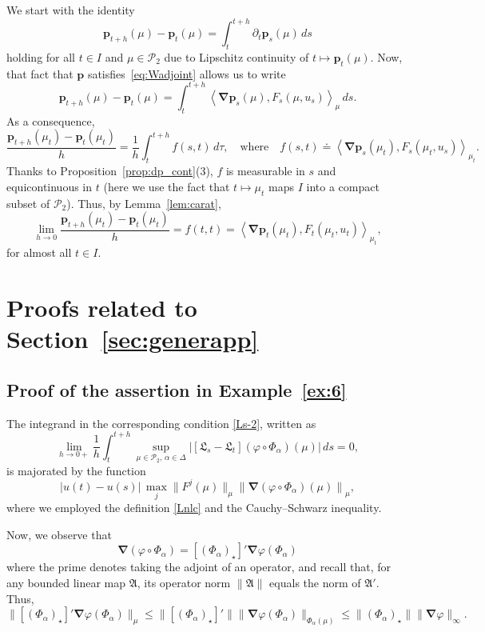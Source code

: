 \documentclass[sn-mathphys-num]{sn-jnl}
\numberwithin{equation}{section}
\theoremstyle{mythm}
\theoremstyle{mydef}
\newenvironment{proofof}[1]{\smallskip\noindent{\textbf{Proof~of~#1.}}%
  \hspace{1pt}}{\hspace{-5pt}{\nobreak\quad\nobreak\hfill\nobreak%
    $\square$\vspace{2pt}\par}\smallskip\goodbreak}
\renewcommand{\phi}{\varphi}
\renewcommand{\d}{\,d}
\renewcommand{\mathbf}[1]{\bm{#1}}
\begin{document}
\begin{proofof}{Proposition~\ref{prop:sysdif}}
  We start with the identity
  \[
    \mathbf{p}_{t+h}(\mu) - \mathbf{p}_t(\mu) = \int_t^{t+h} \partial_t \mathbf{p}_{s}(\mu)\d s
  \]
  holding for all \( t\in I \) and \( \mu\in \mathcal{P}_2 \) due to Lipschitz continuity of \( t\mapsto \mathbf{p}_t(\mu) \).
  Now, that fact that \( \mathbf{p} \) satisfies~\eqref{eq:Wadjoint} allows us to write
  \[
    \mathbf{p}_{t+h}(\mu) - \mathbf{p}_t(\mu) = \int_t^{t+h} \left< \bm \nabla \mathbf{p}_{s}(\mu), F_s(\mu,u_s) \right>_{\mu}\d s.
  \]
  As a consequence,
  \[
    \frac{\mathbf{p}_{t+h}(\mu_t) - \mathbf{p}_t(\mu_t)}{h} = \frac{1}{h}\int_t^{t+h} f(s,t) \d \tau,\quad \text{where} \quad f(s,t) \doteq \left< \bm \nabla \mathbf{p}_{s}(\mu_t), F_s(\mu_t,u_s) \right>_{\mu_t}.
  \]
  Thanks to Proposition~\ref{prop:dp_cont}(3), \( f \) is measurable in \( s \) and equicontinuous in \( t \) (here we use the fact that \( t\mapsto \mu_t \) maps \( I \) into a compact subset of \( \mathcal{P}_2 \)).
  Thus, by Lemma~\ref{lem:carat},
\[
  \lim_{h\to 0}\frac{\mathbf{p}_{t+h}(\mu_t) - \mathbf{p}_t(\mu_t)}{h} = f(t,t) = \left< \bm \nabla \mathbf{p}_{t}(\mu_t), F_t(\mu_t,u_t) \right>_{\mu_t},
  \]
  for almost all \( t \in I \).


\section{Proofs related to Section~\ref{sec:generapp}}\label{app:4}

\subsection{Proof of the assertion in Example~\ref{ex:6}}\label{apex4}

The integrand in the corresponding condition \eqref{Ls-2}, written as
\[
    \lim_{h \to 0+}\frac{1}{h}\int_t^{t+h}\sup_{\mu \in \mathcal P_2, \, \alpha \in \Delta}\big|[\mathfrak{L}_s- \mathfrak{L}_t](\phi\circ \Phi_\alpha)(\mu)\big| \d s=0,
\]
is majorated by the function
\[
     \big|u(t)-u(s)\big| \,\max_j \|F^j(\mu)\|_{\mu} \left\|\bm \nabla (\phi\circ \Phi_\alpha)(\mu)\right\|_{\mu},
\]
where we employed the definition \eqref{Lnlc} and the Cauchy–Schwarz inequality. 

Now, we observe that
\[
    \bm \nabla (\phi\circ \Phi_\alpha) = [(\Phi_\alpha)_{\star}]' \bm \nabla \phi\left(\Phi_\alpha\right)
\]
where the prime denotes taking the adjoint of an operator, and recall that, for any bounded linear map $\mathfrak{A}$, its operator norm $\|\mathfrak A\|$ equals the norm of \(\mathfrak A'\). Thus,  
\[
    \|[(\Phi_\alpha)_{\star}]' \bm \nabla \phi\left(\Phi_\alpha\right)\|_{\mu} \leq \|[(\Phi_\alpha)_{\star}]'\| \|\bm \nabla \phi \left(\Phi_\alpha\right)\|_{{\Phi_\alpha(\mu)}} \leq \|(\Phi_\alpha)_{\star}\| \|\bm \nabla \phi\|_{\infty}.
\]


\end{proofof}
\end{document}
